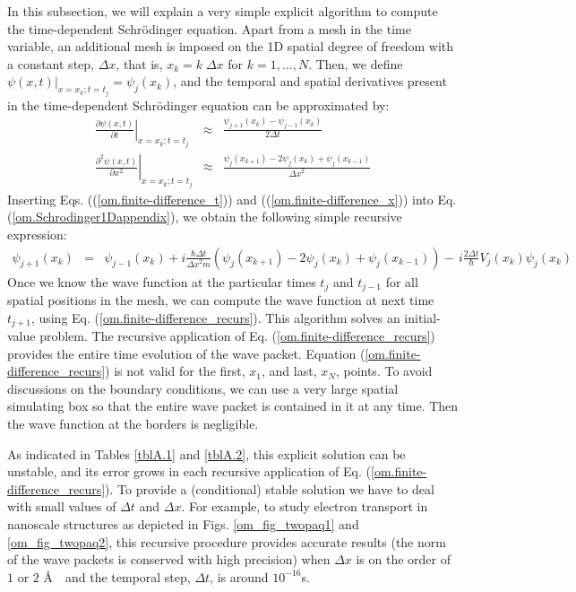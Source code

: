 \documentclass[onecolumn,nofootinbib, secnumarabic, amsmath, nobibnotes,11pt,aps,pra]{revtex4-1}
\newcommand{\pref}[1]{(\ref{#1})}
\newcommand{\eref}[1]{Eq. (\ref{#1})}
\newcommand{\Eref}[1]{Equation (\ref{#1})}
\begin{document}
In this subsection, we will explain a very simple explicit algorithm to compute the time-dependent Schr\"odinger equation. Apart from a mesh in the time variable, an additional mesh is imposed on the 1D spatial degree of freedom with a constant step, $\Delta x$, that is, $x_k = k \; \Delta x $ for $k = 1,\ldots,N$. Then, we define $\psi(x,t)|_{x = x_k;t = t_j} = \psi_{j}(x_k)$, and the temporal and spatial derivatives present in the time-dependent Schr\"odinger equation can be approximated by:
\begin{eqnarray}
\left.\frac{\partial \psi \left(x,t \right)}{\partial t}\right|_{x = x_k;t = t_j} &\approx& \frac{\psi_{j + 1}(x_k) - \psi_{j - 1}(x_k)} {2\Delta t} \label{om.finite-difference_t} \\
\left.\frac{{{\partial }^{2}}\psi \left( x,t \right)}{\partial {{x}^{2}}}\right|_{x = x_k;t = t_j} &\approx& \frac{\psi_{j}(x_{k + 1}) - 2\psi_{j}(x_{k}) + \psi_{j}(x_{k - 1})}{{\Delta x}^{2}} \label{om.finite-difference_x}
\end{eqnarray}
Inserting Eqs. (\pref{om.finite-difference_t}) and (\pref{om.finite-difference_x}) into \eref{om.Schrodinger1Dappendix}, we obtain the following simple recursive expression:
\begin{eqnarray}
\psi_{j + 1}(x_{k}) &=& \psi_{j - 1}(x_{k}) + i\frac{\hbar \Delta t}{{{\Delta x}^{2}}m}\left(\psi_{j}(x_{k + 1}) - 2\psi_{j}(x_{k}) + \psi_{j}(x_{k - 1})\right)-\,i\frac{2\Delta t}{\hbar }V_{j}(x_k) \psi_{j}(x_{k})
\label{om.finite-difference_recurs}
\end{eqnarray}
Once we know the wave function at the particular times $t_j$ and
$t_{j - 1}$ for all spatial positions in the mesh, we can compute
the wave function at next time $t_{j + 1}$, using
\eref{om.finite-difference_recurs}. This algorithm solves an
initial-value problem. The recursive application of
\eref{om.finite-difference_recurs} provides the entire time
evolution of the wave packet. \Eref{om.finite-difference_recurs} is
not valid for the first, $x_1$, and last, $x_N$, points. To avoid
discussions on the boundary conditions, we can use a very large
spatial simulating box so that the entire wave packet is contained
in it at any time. Then the wave function at the borders is
negligible.\enlargethispage{-1pc}

As indicated in Tables \ref{tblA.1} and \ref{tblA.2}, this explicit
solution can be unstable, and its error grows in each recursive
application of \eref{om.finite-difference_recurs}. To provide a
(conditional) stable solution we have to deal with small
values of $\Delta t$ and $\Delta x$. For example, to study electron
transport in nanoscale structures as depicted in
Figs. \ref{om_fig_twopaq1} and \ref{om_fig_twopaq2}, this recursive
procedure provides accurate results (the norm of the wave packets is
conserved with high precision) when $\Delta x$ is on the order of
$1$ or $2$ \AA \  \ and the temporal step, $\Delta t$, is around
$10^{-16}$s.
\end{document}
